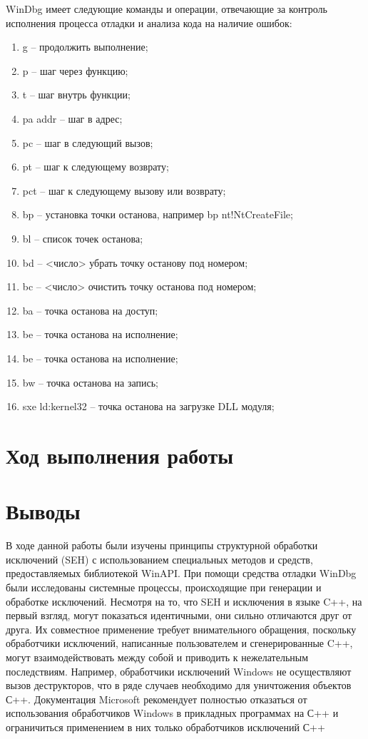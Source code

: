     WinDbg имеет следующие команды и операции, отвечающие за контроль исполнения процесса отладки и анализа кода на наличие ошибок:
    \begin{enumerate}
        \item g – продолжить выполнение;
        \item p – шаг через функцию;
        \item t – шаг внутрь функции;
        \item pa addr – шаг в адрес;
        \item pc – шаг в следующий вызов;
        \item pt – шаг к следующему возврату;
        \item pct – шаг к следующему вызову или возврату;
        \item bp – установка точки останова, например bp nt!NtCreateFile;
        \item bl – список точек останова;
        \item bd – <число> убрать точку останову под номером;
        \item bc – <число> очистить точку останова под номером;
        \item ba – точка останова на доступ;
        \item be – точка останова на исполнение;
        \item be – точка останова на исполнение;
        \item bw – точка останова на запись;
        \item sxe ld:kernel32 – точка останова на загрузке DLL модуля;
    \end{enumerate}
    \section{Ход выполнения работы}

    
    
    \section{Выводы}
    В ходе данной работы были изучены принципы структурной обработки исключений (SEH) с использованием специальных методов и средств, предоставляемых библиотекой WinAPI. При помощи средства отладки WinDbg были исследованы системные процессы, происходящие при генерации и обработке исключений. Несмотря на то, что SEH и исключения в языке C++, на первый взгляд, могут показаться идентичными, они сильно отличаются друг от друга.
    Их совместное применение требует внимательного обращения, поскольку обработчики исключений, написанные пользователем и сгенерированные C++, могут взаимодействовать между собой и приводить к нежелательным последствиям. Например, обработчики исключений Windows не осуществляют вызов деструкторов, что в ряде случаев необходимо для уничтожения объектов С++. Документация Microsoft рекомендует полностью отказаться от использования обработчиков Windows в прикладных программах на С++ и ограничиться применением в них только обработчиков исключений С++

